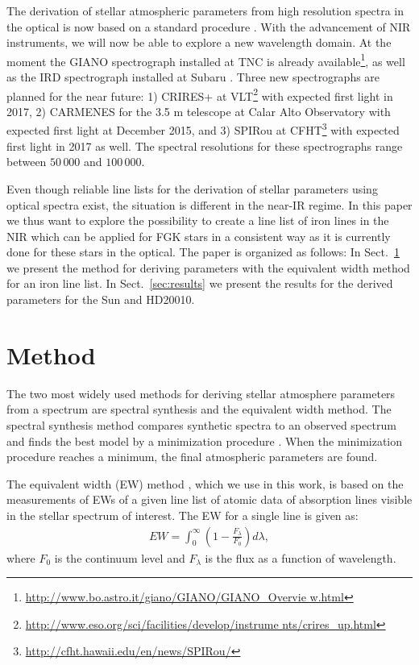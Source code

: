 \documentclass{aa}
\begin{document}
The derivation of stellar atmospheric parameters from high resolution
spectra in the optical is now based on a standard procedure \citep[see
e.g.][]{Valenti2005,Sousa2008a}. With the advancement of NIR
instruments, we will now be able to explore a new wavelength domain.
At the moment the GIANO spectrograph installed at TNC is already
available\footnote{\url{http://www.bo.astro.it/giano/GIANO/GIANO_Overvie
w.html}}, as well as the IRD spectrograph installed
at Subaru \citep{IRD}. Three new spectrographs
are planned for the near future: 1) CRIRES+ at
VLT\footnote{\url{http://www.eso.org/sci/facilities/develop/instrume
nts/crires_up.html}} with expected first light in 2017, 2) CARMENES
for the 3.5 m telescope at Calar Alto Observatory \citep{CARMENES}
with expected first light at December 2015, and 3) SPIRou at
CFHT\footnote{\url{http://cfht.hawaii.edu/en/news/SPIRou/}} with
expected first light in 2017 as well. The spectral resolutions for these
spectrographs range between $50\,000$ and $100\,000$.

Even though reliable line lists for the derivation of stellar parameters
using optical spectra exist, the situation is different in the near-IR
regime. In this paper we thus want to explore the possibility to create
a line list of iron lines in the NIR which can be applied for FGK stars
in a consistent way as it is currently done for these stars in the
optical. The paper is organized as follows: In Sect.~\ref{sec:method}
we present the method for deriving parameters with the equivalent width
method for an iron line list. In Sect.~\ref{sec:results} we present the
results for the derived parameters for the Sun and HD20010.




\section{Method}
\label{sec:method}

The two most widely used methods for deriving stellar atmosphere
parameters from a spectrum are spectral synthesis and the equivalent
width method. The spectral synthesis method compares synthetic spectra
to an observed spectrum and finds the best model by a minimization
procedure \citep[see e.g.][]{Valenti2005,Onehag2012,Blanco2014}. When
the minimization procedure reaches a minimum, the final atmospheric
parameters are found.

The equivalent width (EW) method
\citep{Sousa2008a,Bensby2014,Mucciarelli2013}, which we use in this
work, is based on the measurements of EWs of a given line list of atomic
data of absorption lines visible in the stellar spectrum of interest.
The EW for a single line is given as:
\begin{align}
    \label{eq:EW}
    EW = \int_0^\infty \left(1 - \frac{F_\lambda}{F_0}\right) d\lambda,
\end{align}
where $F_0$ is the continuum level and $F_\lambda$ is the flux as a
function of wavelength.
\end{document}

